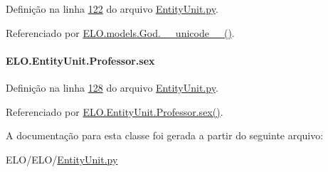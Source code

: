 Definição na linha \hyperlink{EntityUnit_8py_source_l00122}{122} do arquivo \hyperlink{EntityUnit_8py_source}{Entity\-Unit.\-py}.



Referenciado por \hyperlink{classELO_1_1models_1_1God_aec7e462406b98293c953589a3a368825}{E\-L\-O.\-models.\-God.\-\_\-\-\_\-unicode\-\_\-\-\_\-()}.

\hypertarget{classELO_1_1EntityUnit_1_1Professor_ac049dc360c4af27037158e33577288e1}{
\paragraph[{sex}]{\setlength{\rightskip}{0pt plus 5cm}E\-L\-O.\-Entity\-Unit.\-Professor.\-sex}}\label{classELO_1_1EntityUnit_1_1Professor_ac049dc360c4af27037158e33577288e1}


Definição na linha \hyperlink{EntityUnit_8py_source_l00128}{128} do arquivo \hyperlink{EntityUnit_8py_source}{Entity\-Unit.\-py}.



Referenciado por \hyperlink{classELO_1_1EntityUnit_1_1Professor_a2244fa9a5f02a5845cc6c0686b2cf08a}{E\-L\-O.\-Entity\-Unit.\-Professor.\-sex()}.



A documentação para esta classe foi gerada a partir do seguinte arquivo\-:\begin{DoxyCompactItemize}
\item 
E\-L\-O/\-E\-L\-O/\hyperlink{EntityUnit_8py}{Entity\-Unit.\-py}\end{DoxyCompactItemize}
